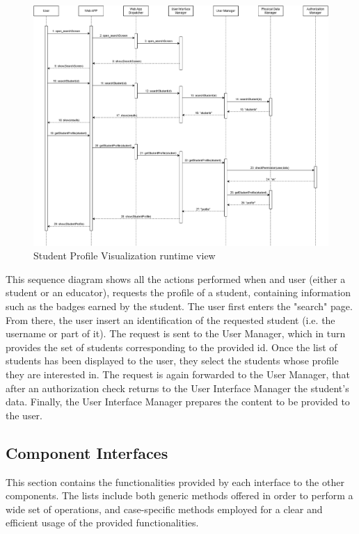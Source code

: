 \begin{itemize}
    \begin{figure}[H]
        \centering
        \includegraphics[width=1\linewidth]{Images/RV15.png}
        \caption{Student Profile Visualization runtime view}
        \label{fig:rv15}
    \end{figure}

    This sequence diagram shows all the actions performed when and user (either a student or an educator), requests the profile of a student, containing information such as the badges earned by the student. The user first enters the "search" page. From there, the user insert an identification of the requested student (i.e. the username or part of it). The request is sent to the User Manager, which in turn provides the set of students corresponding to the provided id. Once the list of students has been displayed to the user, they select the students whose profile they are interested in. The request is again forwarded to the User Manager, that after an authorization check returns to the User Interface Manager the student's data. Finally, the User Interface Manager prepares the content to be provided to the user.

\end{itemize}

\newpage

 \subsection{Component Interfaces}

 This section contains the functionalities provided by each interface to the other components. The lists include both generic methods offered in order to perform a wide set of operations, and case-specific methods employed for a clear and efficient usage of the provided functionalities.

